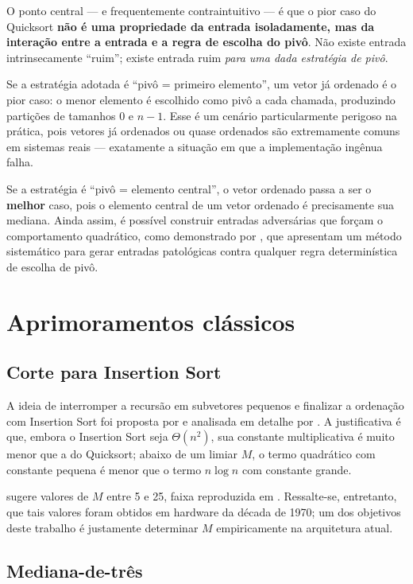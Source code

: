 O ponto central --- e frequentemente contraintuitivo --- é que o pior caso do
Quicksort \textbf{não é uma propriedade da entrada isoladamente, mas da interação
entre a entrada e a regra de escolha do pivô}. Não existe entrada intrinsecamente
``ruim''; existe entrada ruim \textit{para uma dada estratégia de pivô}.

Se a estratégia adotada é ``pivô = primeiro elemento'', um vetor já ordenado é o
pior caso: o menor elemento é escolhido como pivô a cada chamada, produzindo
partições de tamanhos $0$ e $n-1$. Esse é um cenário particularmente perigoso na
prática, pois vetores já ordenados ou quase ordenados são extremamente comuns em
sistemas reais --- exatamente a situação em que a implementação ingênua falha.

Se a estratégia é ``pivô = elemento central'', o vetor ordenado passa a ser o
\textbf{melhor} caso, pois o elemento central de um vetor ordenado é precisamente sua
mediana. Ainda assim, é possível construir entradas adversárias que forçam o
comportamento quadrático, como demonstrado por , que
apresentam um método sistemático para gerar entradas patológicas contra qualquer
regra determinística de escolha de pivô.

\section{Aprimoramentos clássicos}

\subsection{Corte para Insertion Sort}

A ideia de interromper a recursão em subvetores pequenos e finalizar a ordenação com
Insertion Sort foi proposta por  e analisada em detalhe por
. A justificativa é que, embora o Insertion Sort seja
$\Theta(n^2)$, sua constante multiplicativa é muito menor que a do Quicksort; abaixo
de um limiar $M$, o termo quadrático com constante pequena é menor que o termo
$n\log n$ com constante grande.

 sugere valores de $M$ entre 5 e 25, faixa reproduzida em
. Ressalte-se, entretanto, que tais valores foram obtidos
em hardware da década de 1970; um dos objetivos deste trabalho é justamente
determinar $M$ empiricamente na arquitetura atual.

\subsection{Mediana-de-três}

